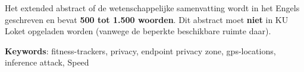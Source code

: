 Het extended abstract of de wetenschappelijke samenvatting wordt in het Engels
geschreven en bevat {\bf 500 tot 1.500 woorden}. Dit abstract moet {\bf niet}
in KU Loket opgeladen worden (vanwege de beperkte beschikbare ruimte daar).

\textbf{Keywords}: fitness-trackers, privacy, endpoint privacy zone, gps-locations, inference attack, Speed